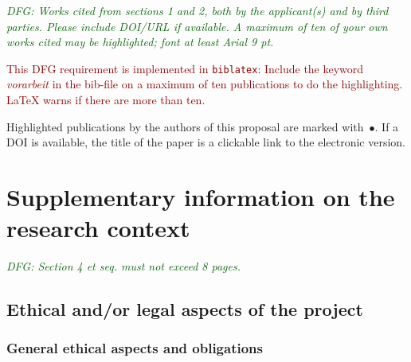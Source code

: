 \documentclass[a4paper,11pt]{amsart}
\newcounter{vorarbeit}
\theoremstyle{definition}
\newcommand{\<}{\langle}
\renewcommand{\>}{\rangle}
\newcommand{\dfg}[1]{\emph{\textcolor{darkgreen}{DFG: #1}}}
\newcommand{\tk}[1]{\textcolor{darkred}{#1}}
\newcommand{\dfgmaxpages}{17}
\newcounter{dfgpageoffset}
\newcommand{\dfgsecondpart}{%
  \clearpage
  \setcounter{dfgpageoffset}{\numexpr\value{page}-1\relax}%
  \renewcommand{\dfgmaxpages}{8}}
\begin{document}
\dfg{Works cited from sections 1 and 2, both by the applicant(s) and
  by third parties. Please include DOI/URL if available. A maximum of
  ten of your own works cited may be highlighted; font at least Arial
  9 pt.}

\tk{This DFG requirement is implemented in \texttt{biblatex}: Include
  the keyword \emph{vorarbeit} in the bib-file on a maximum of ten
  publications to do the highlighting.  LaTeX warns if there are more
  than ten.}

Highlighted publications by the authors of this proposal are marked
with~$\bullet$.  If a DOI is available, the title of the paper is a
clickable link to the electronic version.

\medskip
\printbibliography[heading=none]


\dfgsecondpart
\section{Supplementary information on the research context} \label{sec:suppl}
\dfg{Section 4 et seq. must not exceed 8 pages.}

\subsection{Ethical and/or legal aspects of the project}

\subsubsection{General ethical aspects and obligations}
\end{document}
